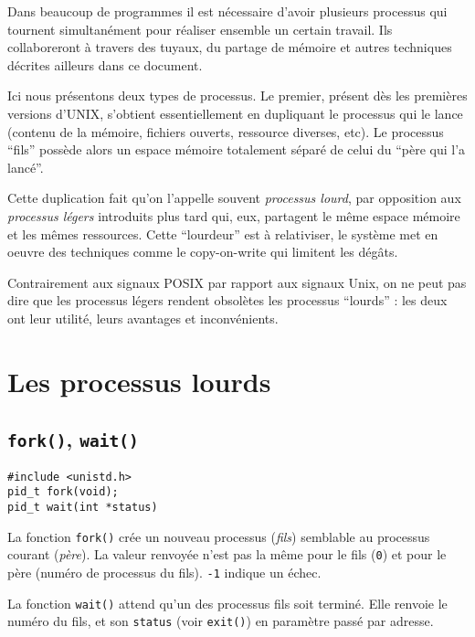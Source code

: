 
Dans beaucoup de programmes il est nécessaire d'avoir plusieurs
processus qui tournent simultanément pour réaliser ensemble un certain
travail. Ils collaboreront à travers des tuyaux, du partage de mémoire
et autres techniques décrites ailleurs dans ce document.

Ici nous présentons deux types de processus. Le premier, présent dès
les premières versions d'UNIX, s'obtient essentiellement en dupliquant
le processus qui le lance (contenu de la mémoire, fichiers ouverts,
ressource diverses, etc).  Le processus ``fils'' possède alors un
espace mémoire totalement séparé de celui du ``père qui l'a lancé''.


Cette duplication fait qu'on l'appelle souvent \emph{processus lourd},
par opposition aux \emph{processus légers} introduits plus tard qui,
eux, partagent le même espace mémoire et les mêmes ressources.
Cette ``lourdeur'' est à relativiser, le système met en oeuvre
des techniques comme le copy-on-write qui limitent les dégâts.

Contrairement aux signaux POSIX par rapport aux signaux Unix, on ne
peut pas dire que les processus légers rendent obsolètes les processus
``lourds'' : les deux ont leur utilité, leurs avantages et inconvénients.


\section{Les processus lourds}
\sloppy
\subsection{\texttt{fork()}, \texttt{wait()}}
\label{fork}


\extrait
\begin{lstlisting}
#include <unistd.h>
pid_t fork(void);
pid_t wait(int *status)
\end{lstlisting}


La fonction \texttt{fork()} crée un nouveau processus (\emph{fils})
semblable au processus courant (\emph{père}). La valeur renvoyée
n'est pas la même pour le fils (\texttt{0}) et pour le père (numéro de
processus du fils). \texttt{-1} indique un échec.


La fonction \texttt{wait()} attend qu'un des processus fils soit
terminé.  Elle renvoie le numéro du fils, et son \texttt{status} (voir
\texttt{exit()}) en paramètre passé par adresse.


